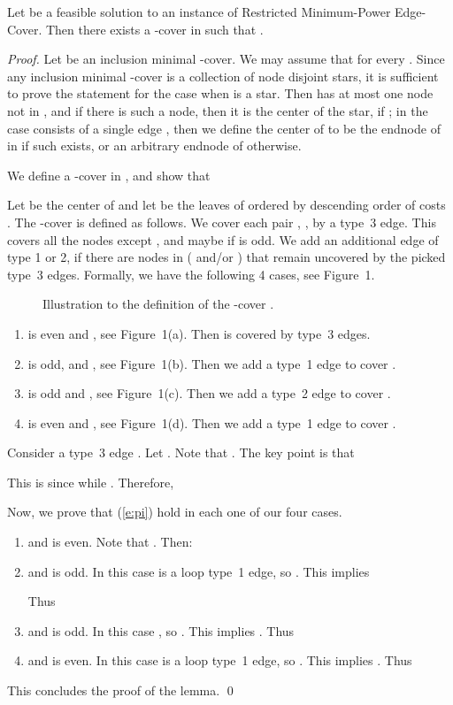 \documentclass{llncs}
\begin{document}
\begin{lemma} \label{l:pi}
Let  be a feasible solution to an instance 
of {\sf Restricted Minimum-Power Edge-Cover}.
Then there exists a -cover  in  such that 
.
\end{lemma}
\begin{proof}
Let  be an inclusion minimal -cover.
We may assume that  for every .
Since any inclusion minimal -cover is a collection of node disjoint stars,
it is sufficient to prove the statement for the case when  is a star.
Then  has at most one node not in , 
and if there is such a node, then it is the center of the star, if ;
in the case  consists of a single edge , then we define the center of  
to be the endnode of  in  if such exists, 
or an arbitrary endnode of  otherwise.

We define a -cover  in , and show that 

Let  be the center of  and let  be the leaves of  
ordered by descending order of costs . 
The -cover  is defined as follows.
We cover each pair , , by a type~3 edge.
This covers all the nodes except , and maybe  if  is odd.
We add an additional edge  of type 1 or 2, if there are nodes in 
( and/or ) that remain uncovered by the picked type~3 edges. 
Formally, we have the following 4 cases, see Figure~1.
\begin{figure} \label{f:cases}
\centering
{}
\caption{Illustration to the definition of the -cover .}
\end{figure}


\begin{enumerate}
\item
 is even and , see Figure~1(a). 
Then  is covered by type~3 edges. 
\item
 is odd, and , see Figure~1(b).  
Then we add a type~1 edge  to cover . 
\item
 is odd and , see Figure~1(c). 
Then we add a type~2 edge  to cover .
\item
 is even and , see Figure~1(d). 
Then we add a type~1 edge  to cover .
\end{enumerate}



Consider a type~3 edge . 
Let .
Note that . The key point is that 

This is since  while .
Therefore, 


Now, we prove that (\ref{e:pi}) hold in each one of our four cases.

\begin{enumerate}
\item 
 and  is even. Note that .
Then: 
\item 
 and  is odd. In this case  is a loop type~1 edge, so 
. 
This implies 

Thus

\item 
 and  is odd. In this case , so 
. 
This implies 
.
Thus

\item 
 and  is even. In this case  is a loop type~1 edge, 
so . This implies .
Thus

\end{enumerate}
This concludes the proof of the lemma.
\qed
\end{proof}
\end{document}
